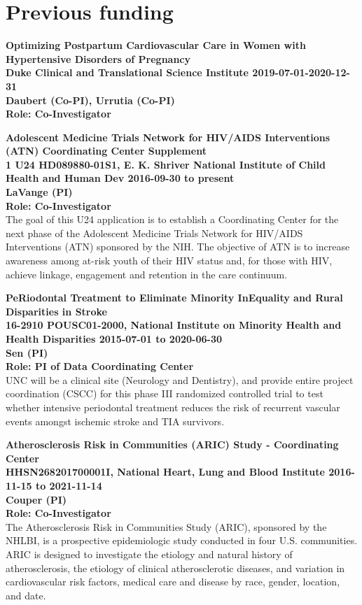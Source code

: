 \documentclass[10pt,letterpaper]{article}
\renewenvironment{itemize}{
  \begin{list}{}{
    \setlength{\leftmargin}{1.5em}
    \setlength{\itemsep}{0.25em}
    \setlength{\parskip}{0pt}
    \setlength{\parsep}{0.25em}
  }
}{
  \end{list}
}
\begin{document}
\section*{Previous funding}
\begin{itemize}
  \item \textbf{Optimizing Postpartum Cardiovascular Care in Women with Hypertensive Disorders of Pregnancy \\ Duke Clinical and Translational Science Institute 2019-07-01-2020-12-31\\  Daubert (Co-PI), Urrutia (Co-PI)\\ 
    Role: Co-Investigator}
    
\item \textbf{Adolescent Medicine Trials Network for HIV/AIDS Interventions (ATN) Coordinating Center Supplement\\1 U24 HD089880-01S1, E. K. Shriver National Institute of Child Health and Human Dev 2016-09-30 to present\\
LaVange (PI)\\
Role: Co-Investigator\\}
The goal of this U24 application is to establish a Coordinating Center for the next phase of the Adolescent Medicine Trials Network for HIV/AIDS Interventions (ATN) sponsored by the NIH. The objective of ATN is to increase awareness among at-risk youth of their HIV status and, for those with HIV, achieve linkage, engagement and retention in the care continuum.\\

\item \textbf{PeRiodontal Treatment to Eliminate Minority InEquality and Rural Disparities in Stroke \\ 16-2910 POUSC01-2000, National Institute on Minority Health and Health Disparities 2015-07-01 to 2020-06-30\\ Sen (PI)\\
    Role: PI of Data Coordinating Center}\\
    UNC will be a clinical site (Neurology and Dentistry), and provide entire project coordination (CSCC) for this phase III randomized controlled trial to test whether intensive periodontal treatment reduces the risk of recurrent vascular events amongst ischemic stroke and TIA survivors.\\
    
    \item \textbf{Atherosclerosis Risk in Communities (ARIC) Study - Coordinating Center\\HHSN268201700001I, National Heart, Lung and Blood Institute 2016-11-15 to 2021-11-14\\
Couper (PI)\\
Role: Co-Investigator}\\
The Atherosclerosis Risk in Communities Study (ARIC), sponsored by the NHLBI, is a prospective epidemiologic study conducted in four U.S. communities. ARIC is designed to investigate the etiology and natural history of atherosclerosis, the etiology of clinical atherosclerotic diseases, and variation in cardiovascular risk factors, medical care and disease by race, gender, location, and date.\\


\end{itemize}
\end{document}
